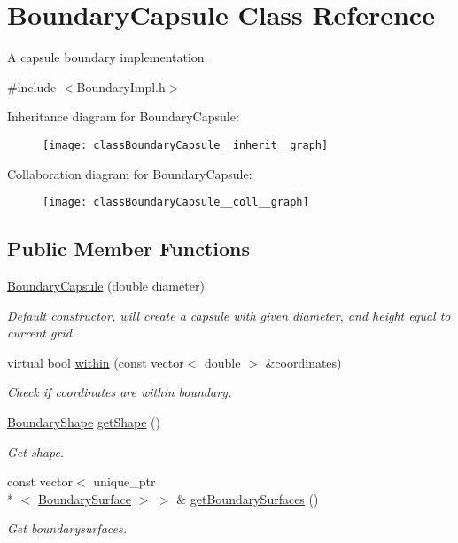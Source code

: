 \hypertarget{classBoundaryCapsule}{\section{Boundary\+Capsule Class Reference}
\label{classBoundaryCapsule}
}


A capsule boundary implementation.  




{\ttfamily \#include $<$Boundary\+Impl.\+h$>$}



Inheritance diagram for Boundary\+Capsule\+:\nopagebreak
\begin{figure}[H]
\begin{center}
\leavevmode
\texttt{[image: classBoundaryCapsule\_\_inherit\_\_graph]}
\end{center}
\end{figure}


Collaboration diagram for Boundary\+Capsule\+:\nopagebreak
\begin{figure}[H]
\begin{center}
\leavevmode
\texttt{[image: classBoundaryCapsule\_\_coll\_\_graph]}
\end{center}
\end{figure}
\subsection*{Public Member Functions}
\begin{DoxyCompactItemize}
\item 
\hyperlink{classBoundaryCapsule_a8a5ab010ef57a344a1cb0a233572b0e1}{Boundary\+Capsule} (double diameter)
\begin{DoxyCompactList}\small\item\em Default constructor, will create a capsule with given diameter, and height equal to current grid. \end{DoxyCompactList}\item 
virtual bool \hyperlink{classBoundaryCapsule_a9e462a1fbb221933735c35df1e7eb75d}{within} (const vector$<$ double $>$ \&coordinates)
\begin{DoxyCompactList}\small\item\em Check if coordinates are within boundary. \end{DoxyCompactList}\item 
\hyperlink{Boundary_8h_a0099b369f2bc119c1b54728734b41132}{Boundary\+Shape} \hyperlink{classBoundary_a20d2121527b207eed35f6719393e3499}{get\+Shape} ()
\begin{DoxyCompactList}\small\item\em Get shape. \end{DoxyCompactList}\item 
const vector$<$ unique\+\_\+ptr\\*
$<$ \hyperlink{classBoundarySurface}{Boundary\+Surface} $>$ $>$ \& \hyperlink{classBoundary_acfa6640f65c432e339108887913539eb}{get\+Boundary\+Surfaces} ()
\begin{DoxyCompactList}\small\item\em Get boundarysurfaces. \end{DoxyCompactList}\end{DoxyCompactItemize}
